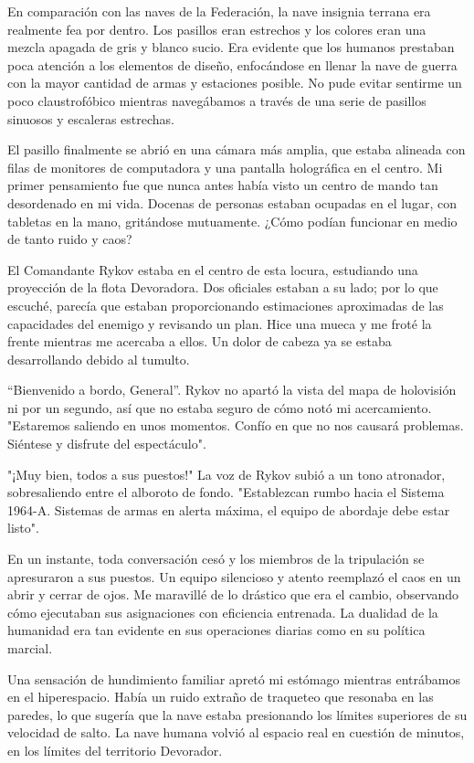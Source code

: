 \documentclass[spanish,12pt,a4paper,oneside,titlepage]{book}
\begin{document}
    En comparación con las naves de la Federación, la nave insignia terrana era realmente fea por dentro. Los pasillos eran estrechos y los colores eran una mezcla apagada de gris y blanco sucio. Era evidente que los humanos prestaban poca atención a los elementos de diseño, enfocándose en llenar la nave de guerra con la mayor cantidad de armas y estaciones posible. No pude evitar sentirme un poco claustrofóbico mientras navegábamos a través de una serie de pasillos sinuosos y escaleras estrechas.

    El pasillo finalmente se abrió en una cámara más amplia, que estaba alineada con filas de monitores de computadora y una pantalla holográfica en el centro. Mi primer pensamiento fue que nunca antes había visto un centro de mando tan desordenado en mi vida. Docenas de personas estaban ocupadas en el lugar, con tabletas en la mano, gritándose mutuamente. ¿Cómo podían funcionar en medio de tanto ruido y caos?

    El Comandante Rykov estaba en el centro de esta locura, estudiando una proyección de la flota Devoradora. Dos oficiales estaban a su lado; por lo que escuché, parecía que estaban proporcionando estimaciones aproximadas de las capacidades del enemigo y revisando un plan. Hice una mueca y me froté la frente mientras me acercaba a ellos. Un dolor de cabeza ya se estaba desarrollando debido al tumulto.

    “Bienvenido a bordo, General”. Rykov no apartó la vista del mapa de holovisión ni por un segundo, así que no estaba seguro de cómo notó mi acercamiento. "Estaremos saliendo en unos momentos. Confío en que no nos causará problemas. Siéntese y disfrute del espectáculo".

    "¡Muy bien, todos a sus puestos!" La voz de Rykov subió a un tono atronador, sobresaliendo entre el alboroto de fondo. "Establezcan rumbo hacia el Sistema 1964-A. Sistemas de armas en alerta máxima, el equipo de abordaje debe estar listo".

    En un instante, toda conversación cesó y los miembros de la tripulación se apresuraron a sus puestos. Un equipo silencioso y atento reemplazó el caos en un abrir y cerrar de ojos. Me maravillé de lo drástico que era el cambio, observando cómo ejecutaban sus asignaciones con eficiencia entrenada. La dualidad de la humanidad era tan evidente en sus operaciones diarias como en su política marcial.

    Una sensación de hundimiento familiar apretó mi estómago mientras entrábamos en el hiperespacio. Había un ruido extraño de traqueteo que resonaba en las paredes, lo que sugería que la nave estaba presionando los límites superiores de su velocidad de salto. La nave humana volvió al espacio real en cuestión de minutos, en los límites del territorio Devorador.
\end{document}
